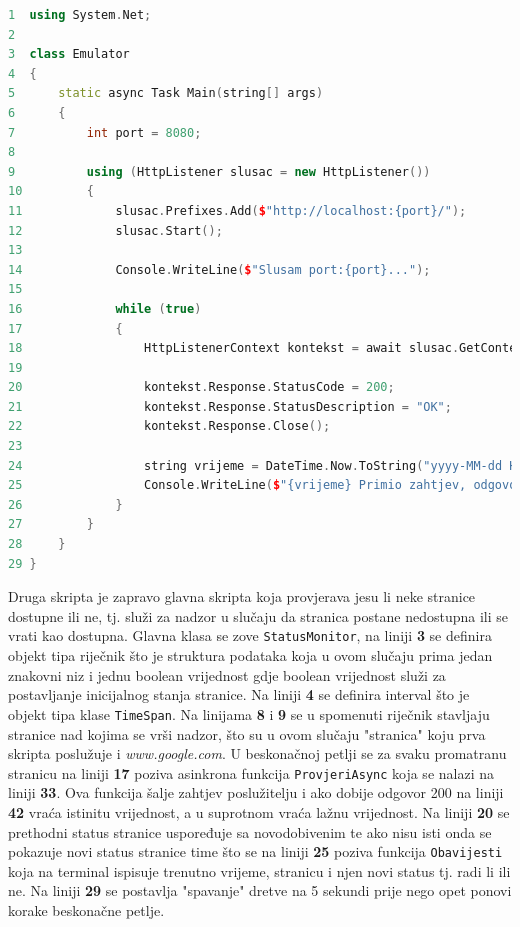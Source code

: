 \documentclass{foi}
\begin{document}
\begin{lstlisting}[language=C++]
1  using System.Net;
2
3  class Emulator
4  {
5      static async Task Main(string[] args)
6      {
7          int port = 8080;
8
9          using (HttpListener slusac = new HttpListener())
10         {
11             slusac.Prefixes.Add($"http://localhost:{port}/");
12             slusac.Start();
13
14             Console.WriteLine($"Slusam port:{port}...");
15
16             while (true)
17             {
18                 HttpListenerContext kontekst = await slusac.GetContextAsync();
19
20                 kontekst.Response.StatusCode = 200;
21                 kontekst.Response.StatusDescription = "OK";
22                 kontekst.Response.Close();
23
24                 string vrijeme = DateTime.Now.ToString("yyyy-MM-dd HH:mm:ss");
25                 Console.WriteLine($"{vrijeme} Primio zahtjev, odgovorio");
26             }
27         }
28     }
29 }
\end{lstlisting}

Druga skripta je zapravo glavna skripta koja provjerava jesu li neke stranice dostupne ili ne, tj. služi za nadzor u slučaju da stranica postane nedostupna ili se vrati kao dostupna. Glavna klasa se zove \verb|StatusMonitor|, na liniji \textbf{3} se definira objekt tipa riječnik što je struktura podataka koja u ovom slučaju prima jedan znakovni niz i jednu boolean vrijednost gdje boolean vrijednost služi za postavljanje inicijalnog stanja stranice. Na liniji \textbf{4} se definira interval što je objekt tipa klase \verb|TimeSpan|. Na linijama \textbf{8} i \textbf{9} se u spomenuti riječnik stavljaju stranice nad kojima se vrši nadzor, što su u ovom slučaju "stranica" koju prva skripta poslužuje i \textit{www.google.com}. U beskonačnoj petlji se za svaku promatranu stranicu na liniji \textbf{17} poziva asinkrona funkcija \verb|ProvjeriAsync| koja se nalazi na liniji \textbf{33}. Ova funkcija šalje zahtjev poslužitelju i ako dobije odgovor 200 na liniji \textbf{42} vraća istinitu vrijednost, a u suprotnom vraća lažnu vrijednost. Na liniji \textbf{20} se prethodni status stranice uspoređuje sa novodobivenim te ako nisu isti onda se pokazuje novi status stranice time što se na liniji \textbf{25} poziva funkcija \verb|Obavijesti| koja na terminal ispisuje trenutno vrijeme, stranicu i njen novi status tj. radi li ili ne. Na liniji \textbf{29} se postavlja "spavanje" dretve na 5 sekundi prije nego opet ponovi korake beskonačne petlje.
\end{document}
